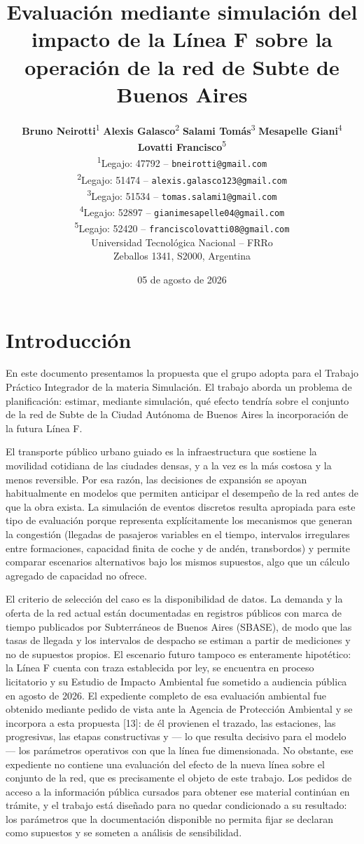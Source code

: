 \documentclass{article}
\title{Evaluación mediante simulación del impacto de la Línea F sobre la operación de la red de Subte de Buenos Aires}
\author{
  \textbf{Bruno Neirotti}\textsuperscript{1} \qquad \textbf{Alexis Galasco}\textsuperscript{2} \qquad \textbf{Salami Tomás}\textsuperscript{3} \qquad \textbf{Mesapelle Giani}\textsuperscript{4} \qquad \textbf{Lovatti Francisco}\textsuperscript{5} \\[0.5ex]
  \textsuperscript{1}Legajo: 47792 -- \texttt{bneirotti@gmail.com} \\
  \textsuperscript{2}Legajo: 51474 -- \texttt{alexis.galasco123@gmail.com} \\
  \textsuperscript{3}Legajo: 51534 -- \texttt{tomas.salami1@gmail.com} \\
  \textsuperscript{4}Legajo: 52897 -- \texttt{gianimesapelle04@gmail.com} \\
  \textsuperscript{5}Legajo: 52420 -- \texttt{franciscolovatti08@gmail.com} \\[0.5ex]
  Universidad Tecnológica Nacional -- FRRo \\
  Zeballos 1341, S2000, Argentina \\
}
\date{05 de agosto de 2026}
\begin{document}
\maketitle

\section{Introducción}

En este documento presentamos la propuesta que el grupo adopta para el Trabajo Práctico Integrador de la
materia Simulación. El trabajo aborda un problema de planificación: estimar, mediante simulación, qué
efecto tendría sobre el conjunto de la red de Subte de la Ciudad Autónoma de Buenos Aires la incorporación
de la futura Línea F.

El transporte público urbano guiado es la infraestructura que sostiene la movilidad cotidiana de las
ciudades densas, y a la vez es la más costosa y la menos reversible. Por esa razón, las decisiones de expansión
se apoyan habitualmente en modelos que permiten anticipar el desempeño de la red antes de que la obra
exista. La simulación de eventos discretos resulta apropiada para este tipo de evaluación porque
representa explícitamente los mecanismos que generan la congestión (llegadas de pasajeros variables en
el tiempo, intervalos irregulares entre formaciones, capacidad finita de coche y de andén, transbordos)
y permite comparar escenarios alternativos bajo los mismos supuestos, algo que un cálculo agregado de
capacidad no ofrece.

El criterio de selección del caso es la disponibilidad de datos. La demanda y la oferta de la red actual
están documentadas en registros públicos con marca de tiempo publicados por Subterráneos de Buenos Aires
(SBASE), de modo que las tasas de llegada y los intervalos de despacho se estiman a partir de mediciones y
no de supuestos propios. El escenario futuro tampoco es enteramente hipotético: la Línea F cuenta con traza
establecida por ley, se encuentra en proceso licitatorio y su Estudio de Impacto Ambiental fue sometido a
audiencia pública en agosto de 2026. El expediente completo de esa evaluación ambiental fue obtenido
mediante pedido de vista ante la Agencia de Protección Ambiental y se incorpora a esta propuesta [13]: de él
provienen el trazado, las estaciones, las progresivas, las etapas constructivas y --- lo que resulta
decisivo para el modelo --- los parámetros operativos con que la línea fue dimensionada. No obstante, ese
expediente no contiene una evaluación del efecto de la nueva línea sobre el conjunto de la red, que es
precisamente el objeto de este trabajo. Los pedidos de acceso a la información pública cursados para
obtener ese material continúan en trámite, y el trabajo está diseñado para no quedar condicionado a su
resultado: los parámetros que la documentación disponible no permita fijar se declaran como supuestos y se
someten a análisis de sensibilidad.
\end{document}
